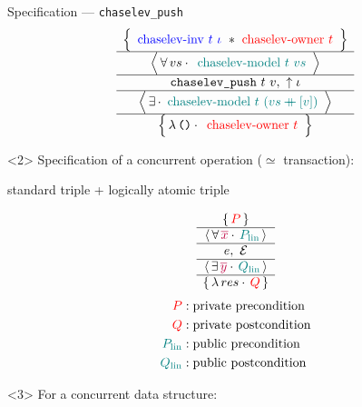\begin{frame}{Specification --- \texttt{chaselev\_push}}
\centering
\[
	\atripleExtPretty{
		\tikz[baseline, remember picture]{\node[anchor=base] (inv_1) {${
			\textcolor{blue}{\mathrm{chaselev \mathhyphen inv}\ t\ \iota}
		}$}} \iSep
		\tikz[baseline, remember picture]{\node[anchor=base] (owner_1) {${
			\textcolor{red}{\mathrm{chaselev \mathhyphen owner}\ t}
		}$}}
	}{
		vs
	}{
		\tikz[baseline, remember picture]{\node[anchor=base] (model_1) {${
			\textcolor{teal}{\mathrm{chaselev \mathhyphen model}\ t\ vs}
		}$}}
	}{
		\texttt{chaselev\_push}\ t\ v
	}{
		\uparrow\iota
	}{
	}{
		\tikz[baseline, remember picture]{\node[anchor=base] (model_2) {${
			\textcolor{teal}{\mathrm{chaselev \mathhyphen model}\ t\ (vs \mdoubleplus [v])}
		}$}}
	}{
		\exprUnit
	}{
		\tikz[baseline, remember picture]{\node[anchor=base] (owner_2) {${
			\textcolor{red}{\mathrm{chaselev \mathhyphen owner}\ t}
		}$}}
	}
\]
\begin{overbox}<2>
	\small
	\centering
	Specification of a concurrent operation ($\simeq$ transaction):
	
	standard triple + logically atomic triple
	
	\[
		\atripleExtPretty{
			\textcolor{red}{P}
		}{
			\textcolor{purple}{\overline{x}}
		}{
			\textcolor{teal}{P_\mathrm{lin}}
		}{
			e
		}{
			\mathcal{E}
		}{
			\textcolor{purple}{\overline{y}}
		}{
			\textcolor{teal}{Q_\mathrm{lin}}
		}{
			res
		}{
			\textcolor{red}{Q}
		}
	\]
	\begin{align*}
			\textcolor{red}{P}
			&:
			\text{private precondition}
		\\
			\textcolor{red}{Q}
			&:
			\text{private postcondition}
		\\
			\textcolor{teal}{P_\mathrm{lin}}
			&:
			\text{public precondition}
		\\
			\textcolor{teal}{Q_\mathrm{lin}}
			&:
			\text{public postcondition}
	\end{align*}
\end{overbox}
\begin{overbox}<3>
	For a concurrent data structure:
	

\end{overbox}
\end{frame}
